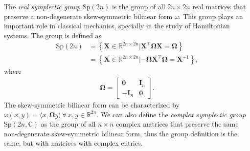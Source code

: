 \begin{example}\label{ex:symplectic-group}
    The \emph{real symplectic group} $\text{Sp}(2n)$ is the group of all $2n\times 2n$ real matrices that preserve a non-degenerate skew-symmetric bilinear form $\omega$. This group plays an important role in classical mechanics, specially in the study of Hamiltonian systems. The group is defined as
    \begin{align}
        \text{Sp}(2n) &= \left\{\mathbf{X}\in\mathbb{R}^{2n\times 2n} | \mathbf{X}^\top\boldsymbol{\Omega}\mathbf{X} = \boldsymbol{\Omega}\right\}\\
        &= \left\{\mathbf{X}\in\mathbb{R}^{2n\times 2n} | -\boldsymbol{\Omega}\mathbf{X}^\top\boldsymbol{\Omega} = \mathbf{X}^{-1}\right\},
    \end{align}
    where 
    \begin{align}
        \boldsymbol{\Omega} = \begin{bmatrix}
            \mathbf{0} & \mathbf{I}_n\\
            -\mathbf{I}_n & \mathbf{0}
        \end{bmatrix}.
    \end{align}
    The skew-symmetric bilinear form can be characterized by $\omega(x,y)=\langle x, \boldsymbol{\Omega}y\rangle\,\forall\,x,y\in\mathbb{R}^{2n}$. We can also define the \emph{complex symplectic group} $\text{Sp}(2n, \mathbb{C})$ as the group of all $n\times n$ complex matrices that preserve the same non-degenerate skew-symmetric bilinear form, thus the group definition is the same, but with matrices with complex entries.
\end{example}

